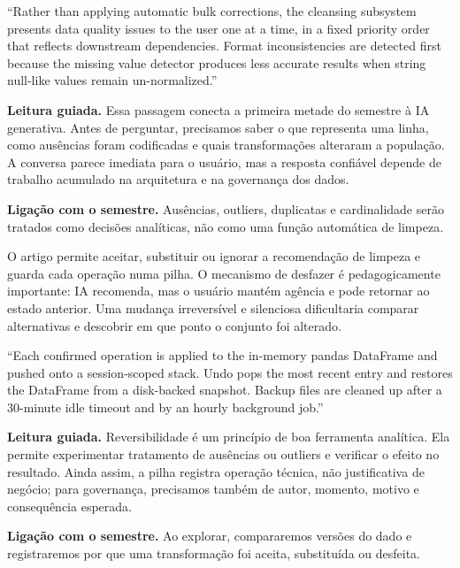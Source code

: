 \begin{ArticleBox}
``Rather than applying automatic bulk corrections, the cleansing subsystem presents data quality issues to the user one at a time, in a fixed priority order that reflects downstream dependencies. Format inconsistencies are detected first because the missing value detector produces less accurate results when string null-like values remain un-normalized.''
\end{ArticleBox}

\noindent\textbf{Leitura guiada.} Essa passagem conecta a primeira metade do semestre à IA generativa. Antes de perguntar, precisamos saber o que representa uma linha, como ausências foram codificadas e quais transformações alteraram a população. A conversa parece imediata para o usuário, mas a resposta confiável depende de trabalho acumulado na arquitetura e na governança dos dados.

\noindent\textbf{Ligação com o semestre.} Ausências, outliers, duplicatas e cardinalidade serão tratados como decisões analíticas, não como uma função automática de limpeza.

O artigo permite aceitar, substituir ou ignorar a recomendação de limpeza e guarda cada operação numa pilha. O mecanismo de desfazer é pedagogicamente importante: IA recomenda, mas o usuário mantém agência e pode retornar ao estado anterior. Uma mudança irreversível e silenciosa dificultaria comparar alternativas e descobrir em que ponto o conjunto foi alterado.

\begin{ArticleBox}
``Each confirmed operation is applied to the in-memory pandas DataFrame and pushed onto a session-scoped stack. Undo pops the most recent entry and restores the DataFrame from a disk-backed snapshot. Backup files are cleaned up after a 30-minute idle timeout and by an hourly background job.''
\end{ArticleBox}

\noindent\textbf{Leitura guiada.} Reversibilidade é um princípio de boa ferramenta analítica. Ela permite experimentar tratamento de ausências ou outliers e verificar o efeito no resultado. Ainda assim, a pilha registra operação técnica, não justificativa de negócio; para governança, precisamos também de autor, momento, motivo e consequência esperada.

\noindent\textbf{Ligação com o semestre.} Ao explorar, compararemos versões do dado e registraremos por que uma transformação foi aceita, substituída ou desfeita.

